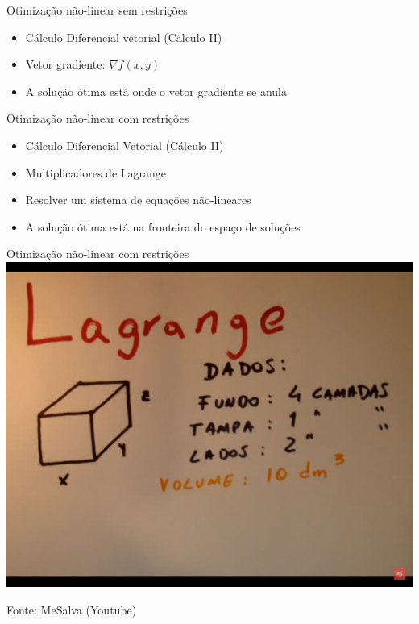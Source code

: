 \documentclass{beamer}
\begin{document}
\begin{frame}{Otimização não-linear sem restrições}
  \begin{itemize}
  \item Cálculo Diferencial vetorial (Cálculo II)
  \item Vetor gradiente: $\nabla f(x,y)$
  \item A solução ótima está onde o vetor gradiente se anula
  \end{itemize}
\end{frame}

\begin{frame}{Otimização não-linear com restrições}
  \begin{itemize}
  \item Cálculo Diferencial Vetorial (Cálculo II)
  \item Multiplicadores de Lagrange
  \item Resolver um sistema de equações não-lineares
  \item A solução ótima está na fronteira do espaço de soluções
  \end{itemize}
\end{frame}

\begin{frame}{Otimização não-linear com restrições}
  \centering
  \includegraphics[height=.8\textheight]{otimizacao/lagrange1}

\vfill
Fonte: MeSalva (Youtube)
\end{frame}
\end{document}
